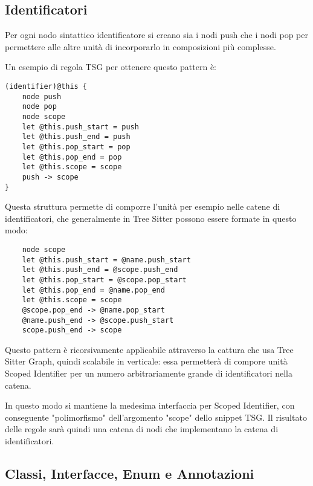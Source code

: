 
\subsection{Identificatori}

Per ogni nodo sintattico identificatore si creano sia i nodi push che i nodi pop per permettere alle altre unit\`a di incorporarlo in composizioni pi\`u complesse.


Un esempio di regola TSG per ottenere questo pattern \`e:

\begin{lstlisting}
(identifier)@this {
    node push
    node pop
    node scope
    let @this.push_start = push
    let @this.push_end = push
    let @this.pop_start = pop
    let @this.pop_end = pop
    let @this.scope = scope
    push -> scope
}
\end{lstlisting}

Questa struttura permette di comporre l'unit\`a per esempio nelle catene di identificatori, che generalmente in Tree Sitter possono essere formate in questo modo:

\begin{lstlisting}
    node scope
    let @this.push_start = @name.push_start
    let @this.push_end = @scope.push_end
    let @this.pop_start = @scope.pop_start
    let @this.pop_end = @name.pop_end
    let @this.scope = scope
    @scope.pop_end -> @name.pop_start
    @name.push_end -> @scope.push_start
    scope.push_end -> scope
\end{lstlisting}

Questo pattern \`e ricorsivamente applicabile attraverso la cattura che usa Tree Sitter Graph, quindi scalabile in verticale: essa permetter\`a di compore unit\`a Scoped Identifier per un numero arbitrariamente grande di identificatori nella catena.


In questo modo si mantiene la medesima interfaccia per Scoped Identifier, con conseguente "polimorfismo" dell'argomento "scope" dello snippet TSG. Il risultato delle regole sar\`a quindi una catena di nodi che implementano la catena di identificatori.

\subsection{Classi, Interfacce, Enum e Annotazioni}

